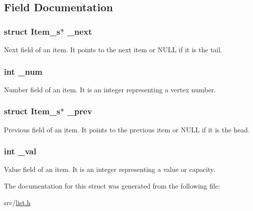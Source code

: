 \subsection{Field Documentation}
\hypertarget{struct_item__s_a258b9cfe39d892032f03d6386517dbf4}{
\subsubsection[{\-\_\-next}]{\setlength{\rightskip}{0pt plus 5cm}struct {\bf Item\-\_\-s}$\ast$ {\bf \-\_\-next}}}\label{struct_item__s_a258b9cfe39d892032f03d6386517dbf4}
Next field of an item. It points to the next item or N\-U\-L\-L if it is the tail. \hypertarget{struct_item__s_a2736f16f0001a4bc44750c489864c3f4}{
\subsubsection[{\-\_\-num}]{\setlength{\rightskip}{0pt plus 5cm}int {\bf \-\_\-num}}}\label{struct_item__s_a2736f16f0001a4bc44750c489864c3f4}
Number field of an item. It is an integer representing a vertex number. \hypertarget{struct_item__s_af9a311891ad1748835c3968f6a22909b}{
\subsubsection[{\-\_\-prev}]{\setlength{\rightskip}{0pt plus 5cm}struct {\bf Item\-\_\-s}$\ast$ {\bf \-\_\-prev}}}\label{struct_item__s_af9a311891ad1748835c3968f6a22909b}
Previous field of an item. It points to the previous item or N\-U\-L\-L if it is the head. \hypertarget{struct_item__s_a84d66405cd21b56f8b33b282271cf71a}{
\subsubsection[{\-\_\-val}]{\setlength{\rightskip}{0pt plus 5cm}int {\bf \-\_\-val}}}\label{struct_item__s_a84d66405cd21b56f8b33b282271cf71a}
Value field of an item. It is an integer representing a value or capacity. 

The documentation for this struct was generated from the following file\-:\begin{DoxyCompactItemize}
\item 
src/\hyperlink{list_8h}{list.\-h}\end{DoxyCompactItemize}
